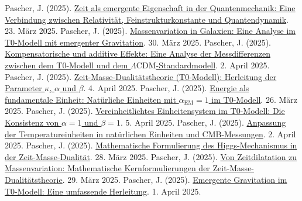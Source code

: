 \documentclass[12pt,a4paper]{article}
\newcommand{\alphaEM}{\alpha_{\text{EM}}}
\newcommand{\LCDM}{\Lambda\text{CDM}}
\begin{document}
	\begin{thebibliography}{99}
		 Pascher, J. (2025). \href{https://github.com/jpascher/T0-Time-Mass-Duality/tree/main/2/pdf/Deutsch/NatEinheitenAlpha1.pdf}{Zeit als emergente Eigenschaft in der Quantenmechanik: Eine Verbindung zwischen Relativität, Feinstrukturkonstante und Quantendynamik}. 23. März 2025.
		 Pascher, J. (2025). \href{https://github.com/jpascher/T0-Time-Mass-Duality/tree/main/2/pdf/Deutsch/MassVarGalaxien.pdf}{Massenvariation in Galaxien: Eine Analyse im T0-Modell mit emergenter Gravitation}. 30. März 2025.
		 Pascher, J. (2025). \href{https://github.com/jpascher/T0-Time-Mass-Duality/tree/main/2/pdf/Deutsch/MessdifferenzenT0Standard.pdf}{Kompensatorische und additive Effekte: Eine Analyse der Messdifferenzen zwischen dem T0-Modell und dem \(\LCDM\)-Standardmodell}. 2. April 2025.
		 Pascher, J. (2025). \href{https://github.com/jpascher/T0-Time-Mass-Duality/tree/main/2/pdf/Deutsch/ZeitMasseT0Params.pdf}{Zeit-Masse-Dualitätstheorie (T0-Modell): Herleitung der Parameter \(\kappa\), \(\alpha\) und \(\beta\)}. 4. April 2025.
		 Pascher, J. (2025). \href{https://github.com/jpascher/T0-Time-Mass-Duality/tree/main/2/pdf/Deutsch/NatEinheitenAlpha1.pdf}{Energie als fundamentale Einheit: Natürliche Einheiten mit \(\alphaEM = 1\) im T0-Modell}. 26. März 2025.
		 Pascher, J. (2025). \href{https://github.com/jpascher/T0-Time-Mass-Duality/tree/main/2/pdf/Deutsch/Alpha1Beta1Konsistenz.pdf}{Vereinheitlichtes Einheitensystem im T0-Modell: Die Konsistenz von \(\alpha = 1\) und \(\beta = 1\)}. 5. April 2025.
		 Pascher, J. (2025). \href{https://github.com/jpascher/T0-Time-Mass-Duality/tree/main/2/pdf/Deutsch/NatEinheitenAlpha1.pdf}{Anpassung der Temperatureinheiten in natürlichen Einheiten und CMB-Messungen}. 2. April 2025.
		 Pascher, J. (2025). \href{https://github.com/jpascher/T0-Time-Mass-Duality/tree/main/2/pdf/Deutsch/MathHiggsZeitMasse.pdf}{Mathematische Formulierung des Higgs-Mechanismus in der Zeit-Masse-Dualität}. 28. März 2025.
		 Pascher, J. (2025). \href{https://github.com/jpascher/T0-Time-Mass-Duality/tree/main/2/pdf/Deutsch/MathZeitMasseLagrange.pdf}{Von Zeitdilatation zu Massenvariation: Mathematische Kernformulierungen der Zeit-Masse-Dualitätstheorie}. 29. März 2025.
		 Pascher, J. (2025). \href{https://github.com/jpascher/T0-Time-Mass-Duality/tree/main/2/pdf/Deutsch/EmergentGravT0.pdf}{Emergente Gravitation im T0-Modell: Eine umfassende Herleitung}. 1. April 2025.

\end{thebibliography}
\end{document}
